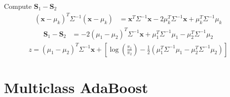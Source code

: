 \documentclass[12pt,a4paper]{article}
\begin{document}
\begin{enumerate}
\begin{enumerate}
                Compute $\mathbf{S}_{1} - \mathbf{S}_{2}$
                \begin{align*}
                    (\mathbf{x}-\mu_{k})^T\Sigma^{-1}(\mathbf{x}-\mu_{k})
                        &= \mathbf{x}^T\Sigma^{-1}\mathbf{x} - 2\mu_{k}^T\Sigma^{-1}\mathbf{x} + \mu_{k}^T\Sigma^{-1}\mu_{k}
                \end{align*}
                \begin{align*}
                    \mathbf{S}_{1} - \mathbf{S}_{2}
                        &= - 2(\mu_{1}-\mu_{2})^{T}\Sigma^{-1}\mathbf{x} + \mu_{1}^T\Sigma^{-1}\mu_{1} - \mu_{2}^T\Sigma^{-1}\mu_{2}
                \end{align*}
                \begin{align*}
                    z = (\mu_{1}-\mu_{2})^{T}\Sigma^{-1}\mathbf{x} + [\log(\frac{\pi_{1}}{\pi_{2}}) - \frac{1}{2}(\mu_{1}^T\Sigma^{-1}\mu_{1} - \mu_{2}^T\Sigma^{-1}\mu_{2})]
                \end{align*}
        \end{enumerate}
    
\end{enumerate}

\section{Multiclass AdaBoost}    
\end{document}
